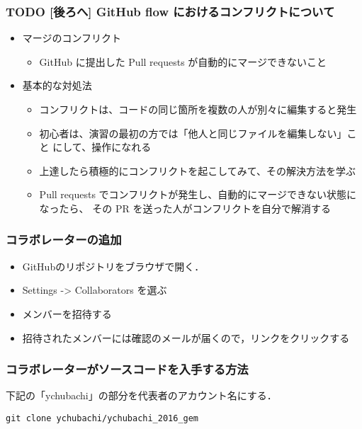 \documentclass{bxjsarticle}
\begin{document}
\subsubsection{{\bfseries\sffamily TODO} [後ろへ] GitHub flow におけるコンフリクトについて}
\label{sec-3-2-4}
\begin{itemize}
\item マージのコンフリクト
\begin{itemize}
\item GitHub に提出した Pull requests が自動的にマージできないこと
\end{itemize}
\item 基本的な対処法
\begin{itemize}
\item コンフリクトは、コードの同じ箇所を複数の人が別々に編集すると発生
\item 初心者は、演習の最初の方では「他人と同じファイルを編集しない」こと
にして、操作になれる
\item 上達したら積極的にコンフリクトを起こしてみて、その解決方法を学ぶ
\item Pull requests でコンフリクトが発生し、自動的にマージできない状態に
なったら、 その PR を送った人がコンフリクトを自分で解消する
\end{itemize}
\end{itemize}
\subsubsection{コラボレーターの追加}
\label{sec-3-2-5}

\begin{itemize}
\item GitHubのリポジトリをブラウザで開く．
\item Settings -> Collaborators を選ぶ
\item メンバーを招待する
\item 招待されたメンバーには確認のメールが届くので，リンクをクリックする
\end{itemize}

\subsubsection{コラボレーターがソースコードを入手する方法}
\label{sec-3-2-6}

下記の「ychubachi」の部分を代表者のアカウント名にする．
\begin{verbatim}
git clone ychubachi/ychubachi_2016_gem
\end{verbatim}
\end{document}
